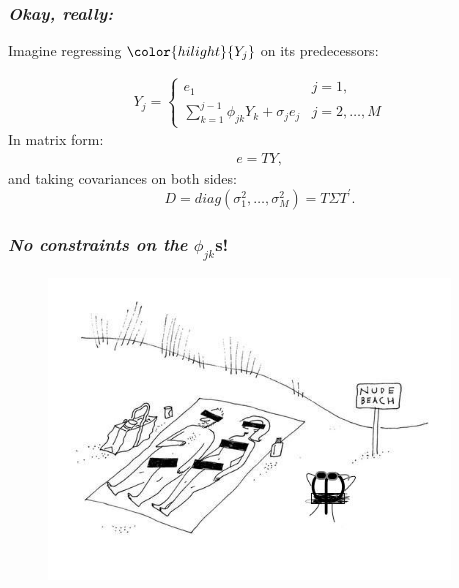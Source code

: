 \documentclass[12pt]{beamer}
\newcommand{\ms}{\scriptscriptstyle}
\newcommand{\newthought}[1]{{\small \color{hilight} {#1}}}
\begin{document}
\begin{frame}
\frametitle{\emph{Okay, really:}}

\newthought{Imagine regressing} $\color{hilight}{Y_j}$ \newthought{on its predecessors:}

\begin{align} \label{eq:ARmodel}
{Y}_{j}  = \left\{ \begin{array}{ll} 
		e_1 & j=1, \\
                  \sum \limits_{k=1}^{j-1} \phi_{jk} Y_{k} + \sigma_{j}e_{j} &  j=2,\dots,M
\end{array} \right.
\end{align}
\noindent
In matrix form:
\begin{align}
e = TY,
\end{align}
\noindent
 and taking covariances on both sides:
\begin{equation}
 D = diag\left( \sigma_1^{\ms 2},\dots, \sigma_M^{\ms 2} \right) = T \Sigma T^\prime.
\end{equation}
\end{frame}








\begin{frame}
\frametitle{\emph{No constraints on the} $\phi_{jk}$s!}

\begin{adjustwidth}{-3cm}{-3cm}
\begin{center}
\begin{figure}
\graphicspath{{img/}}
  \includegraphics[height=8cm]{nude-beach}
\end{figure}
\end{center}
  \end{adjustwidth}
\end{frame}
\end{document}

